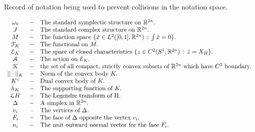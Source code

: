 \documentclass[../capacities_main.tex]{subfiles}
\begin{document}
	
	
	Record of notation being used to prevent collisions in the notation space.
	
	\begin{equation*}
	\begin{aligned}
	\begin{array}{ccl}
	\omega_0 & - & \mbox{The standard symplectic structure on }{\mathbb R}^{2n}.\\
	J & - & \mbox{The standard complex structure on }{\mathbb R}^{2n}.\\
	M & - & \mbox{The function space }\{\dot x\in L^{2}([0,1],{\mathbb R}^{2n})\,:\, \int \dot x = 0\}.\\
	{\mathcal F}_K & - & \mbox{The functional on } M.\\
	\mathcal{E}_K & - & \mbox{The space of closed characteristics }\{z\in C^2(S^1,{\mathbb R}^{2n})\,:\,\dot z = X_H\}.\\
	\mathcal{A} & - & \mbox{The action on } \mathcal{E}_K.\\
	\mathcal{K} & - & \mbox{the set of all compact, strictly convex subsets of }{\mathbb R}^{2n}\mbox{ which have }C^2\mbox{ boundary.}\\
	||\cdot||_K & - & \mbox{Norm of the convex body }K.\\
	K^{\circ} & - & \mbox{Dual convex body of } K.\\
	h_K & - & \mbox{The supporting function of }K. \\
	\mathcal{L}H & - & \mbox{The Legendre transform of H.} \\
	\Delta & - & \mbox{A simplex in }{\mathbb R}^{2n}.\\
	v_i & - & \mbox{The vertices of }\Delta.\\
	F_i & - & \mbox{The face of } \Delta \mbox{ opposite the vertex } v_i. \\
	n_i & - & \mbox{The unit outward normal vector for the face }F_i.
	\end{array}
	\end{aligned}
	\end{equation*}
	
	
\end{document}

